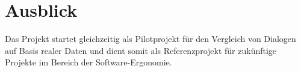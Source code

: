 \section{Ausblick}
Das Projekt startet gleichzeitig als Pilotprojekt für den Vergleich von Dialogen auf Basis realer Daten und dient somit als Referenzprojekt für zukünftige Projekte im Bereich der Software-Ergonomie.